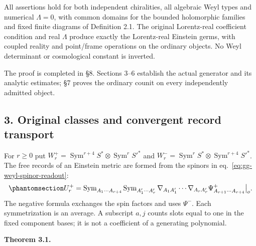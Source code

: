 \documentclass[
  english,
  11pt,
  reqno]{amsart}
\makeatletter
\newcommand{\pandocstatementheading}[1]{%
  \par\addpenalty{\@beginparpenalty}%
  \addvspace{.5\baselineskip plus .2\baselineskip minus .2\baselineskip}%
  {\normalfont\bfseries #1\par}%
  \nobreak\@afterindenttrue\@afterheading
}
\makeatother
\begin{document}
All assertions hold for both independent chiralities, all algebraic Weyl
types and numerical \(\Lambda=0\), with common domains for the bounded
holomorphic families and fixed finite diagrams of Definition 2.1. The
original Lorentz-real coefficient condition and real \(\Lambda\) produce
exactly the Lorentz-real Einstein germs, with coupled reality and
point/frame operations on the ordinary objects. No Weyl determinant or
cosmological constant is inverted.

The proof is completed in §8. Sections 3--6 establish the actual
generator and its analytic estimates; §7 proves the ordinary counit on
every independently admitted object.

\protect{}\label{sec:gg-records}

\subsection{3. Original classes and convergent record
transport}\label{original-classes-and-convergent-record-transport}

For \(r\ge0\) put
\(W_r^+=\operatorname{Sym}^{r+4}S^*\otimes\operatorname{Sym}^rS'^*\) and
\(W_r^-=\operatorname{Sym}^rS^*\otimes\operatorname{Sym}^{r+4}S'^*\).
The free records of an Einstein metric are formed from the spinors in
eq.~\ref{eq:gg-weyl-spinor-readout}:
\begin{equation}\protect\phantomsection\label{eq:gg-free-record-projection}{
 U_r^+=\operatorname{Sym}_{A_1\cdots A_{r+4}}
       \operatorname{Sym}_{A'_1\cdots A'_r}
       \nabla_{A_1A'_1}\cdots\nabla_{A_rA'_r}
                     \Psi^+_{A_{r+1}\cdots A_{r+4}}\big|_o .
}\end{equation} The negative formula exchanges the spin factors and uses
\(\Psi^-\). Each symmetrization is an average. A subscript \(a,j\)
counts slots equal to one in the fixed component bases; it is not a
coefficient of a generating polynomial.

\pandocstatementheading{\protect{}\label{thm:gg-residue}Theorem 3.1.}
\end{document}
